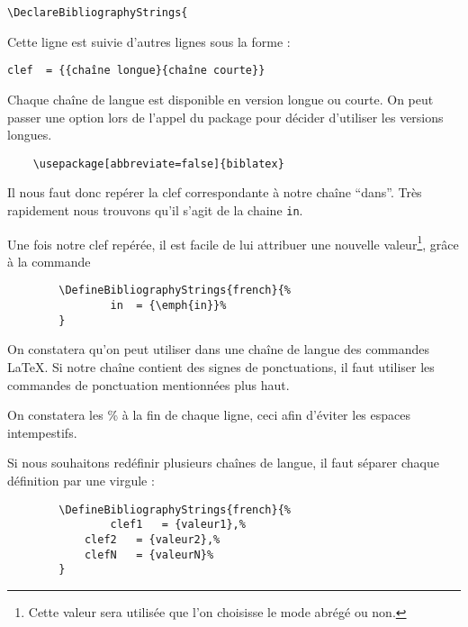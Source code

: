 	\verb|\DeclareBibliographyStrings{|
	
	Cette ligne est suivie d'autres lignes sous la forme :
	
	\verb|clef	= {{chaîne longue}{chaîne courte}}|
	
	\begin{anedocte}
	Chaque chaîne de langue est disponible en version longue ou courte. On peut passer une option lors de l'appel du package  pour décider d'utiliser les versions longues.
	
	\begin{verbatim}
	\usepackage[abbreviate=false]{biblatex}
	\end{verbatim}
		
	\end{anedocte}
	Il nous faut donc repérer la clef correspondante à notre chaîne \enquote{dans}. Très rapidement nous trouvons qu'il s'agit de la chaine \verb|in|.
	
	Une fois  notre clef repérée, il est facile de lui attribuer une nouvelle valeur\footnote{Cette valeur sera utilisée que l'on choisisse le mode abrégé ou non.}, grâce à la commande 
	
	\begin{verbatim}
		\DefineBibliographyStrings{french}{%
      		  	in 	= {\emph{in}}%
		}
	\end{verbatim}
	
	On constatera qu'on peut utiliser dans une chaîne de langue des commandes LaTeX. Si notre chaîne contient des signes de ponctuations, il faut utiliser les commandes de ponctuation mentionnées plus haut.
	
	On constatera les \% à la fin de chaque ligne, ceci afin d'éviter les espaces intempestifs.
	
	Si nous souhaitons redéfinir plusieurs chaînes de langue, il faut séparer chaque définition par une virgule :
	
	\begin{verbatim}
		\DefineBibliographyStrings{french}{%
      		  	clef1 	= {valeur1},%
			clef2	= {valeur2},%
			clefN	= {valeurN}%
		}
	\end{verbatim}
	
	
	